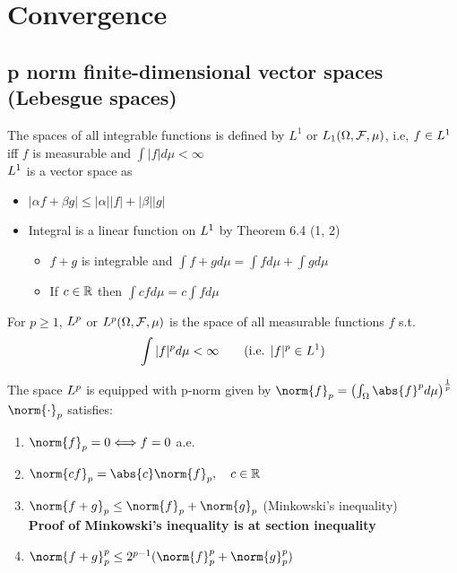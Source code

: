 \newpage
\section{Convergence}
\subsection{p norm finite-dimensional vector spaces (Lebesgue spaces)}
The spaces of all integrable functions is defined by $L^1$ or $L_1 (\Omega, \mathcal{F}, \mu)$, i.e, $f \in L^{1}$ iff $f$ is measurable and $\int |f| d\mu < \infty$ \\
$L^{1}$ is a vector space as 
\begin{itemize}
    \item $|\alpha f + \beta g| \leq |\alpha||f| + |\beta||g|$
    \item Integral is a linear function on $L^{1}$ by Theorem 6.4 (1, 2)
    \begin{itemize}
        \item $f+g$ is integrable and $\int f+g d\mu = \int f d\mu +\int g d\mu$
        \item If $c\in\mathbb{R}$ then $\int cf d\mu = c\int f d\mu$
    \end{itemize}
\end{itemize}
\begin{dfn}
For $p \geq 1$, $L^{p}$ or $L^{p}(\Omega, \mathcal{F}, \mu)$ is the space of all measurable functions $f$ s.t. 
\begin{equation*}
    \int |f|^p d\mu < \infty \qquad (\text{i.e. } |f|^p \in L^{1})
\end{equation*}
\end{dfn}
The space $L^{p}$ is equipped with p-norm given by $\norm{f}_p = \left( \into \abs{f}^p d\mu \right)^{\frac{1}{p}}$ \\
$\norm{\cdot}_p$ satisfies:
\begin{enumerate}
    \item $\norm{f}_p = 0 \Longleftrightarrow f = 0$ a.e.
    \item $\norm{cf}_p = \abs{c}\norm{f}_p, \quad c\in \R$
    \item $\norm{f+g}_p \leq \norm{f}_p +\norm{g}_p$ (Minkowski's inequality) \\
    \textbf{Proof of Minkowski's inequality is at section inequality}
    \item $\norm{f+g}_p^p \leq 2^{p-1}(\norm{f}_p^p +\norm{g}_p^p) $
\end{enumerate}
 \\
